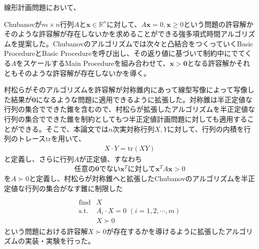 線形計画問題において、

Chubanovが$m \times n$行列$A$と$\mathbf{x} \in \mathbb{R}^n$に対して、$A \mathbf{x} = 0, \mathbf{x} \geq 0$という問題の許容解かそのような許容解が存在しないかを求めることができる強多項式時間アルゴリズムを提案した\cite{Chubanov}。Chubanovのアルゴリズムでは次々と凸結合をつくっていくBasic ProcedureとBasic Procedureを呼び出し、その返り値に基づいて制約中にでてくる$A$をスケールするMain Procedureを組み合わせて、$\mathbf{x} > \mathbf{0}$となる許容解かそれともそのような許容解が存在しないかを導く。

村松らがそのアルゴリズムを許容解が対称錐内にあって線型写像によって写像した結果が$\mathbf{0}$になるような問題に適用できるように拡張した\cite{SymmetricCone}。対称錐は半正定値な行列の集合でできた錐を含むので、村松らが拡張したアルゴリズムを半正定値な行列の集合でできた錐を制約としてもつ半正定値計画問題に対しても適用することができる。そこで、本論文では$n$次実対称行列$X, Y$に対して、行列の内積を行列のトレース$\mathrm{tr}$を用いて、
\begin{align*}
  X \cdot Y = \mathrm{tr}(X Y)
\end{align*}
と定義し、さらに行列$A$が正定値、すなわち
\begin{align}
  \text{任意の} \mathbf{0} \text{でない} \mathbf{x}^T \text{に対して} \mathbf{x}^T A \mathbf{x} > 0 \label{PD}
\end{align}
を$A \succ 0$と定義し、村松らが対称錐へと拡張したChubanovのアルゴリズムを半正定値な行列の集合がなす錐に制限した
\begin{align} \label{SemidefiniteSystem}
  \begin{array}{ll} \\
    \text{find} & X \\
    \text{s.t.} & A_i \cdot X = 0 \,\, (i = 1, 2, \cdots, m) \\
                & X \succ 0
  \end{array}
\end{align}
という問題における許容解$X \succ 0$が存在するかを導けるように拡張したアルゴリズムの実装・実験を行った。
